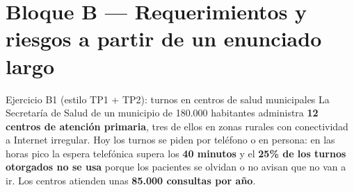 \documentclass[11pt,a4paper]{article}
\begin{document}
\section{Bloque B --- Requerimientos y riesgos a partir de un enunciado largo}
\begin{enunciado}{Ejercicio B1 (estilo TP1 + TP2): turnos en centros de salud municipales}
\small
La Secretaría de Salud de un municipio de 180.000 habitantes administra \textbf{12 centros de atención
primaria}, tres de ellos en zonas rurales con conectividad a Internet irregular. Hoy los turnos se piden por
teléfono o en persona: en las horas pico la espera telefónica supera los \textbf{40 minutos} y el
\textbf{25\% de los turnos otorgados no se usa} porque los pacientes se olvidan o no avisan que no van a ir. Los
centros atienden unas \textbf{85.000 consultas por año}.


\end{enunciado}
\end{document}
